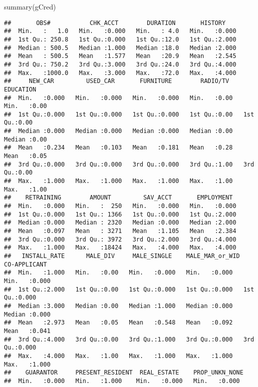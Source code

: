 \documentclass[
]{article}
\newenvironment{Shaded}{\begin{snugshade}}{\end{snugshade}}
\newcommand{\FunctionTok}[1]{\textcolor[rgb]{0.00,0.00,0.00}{#1}}
\newcommand{\NormalTok}[1]{#1}
\begin{document}
\begin{Shaded}
\begin{Highlighting}[]
\FunctionTok{summary}\NormalTok{(gCred)}
\end{Highlighting}
\end{Shaded}

\begin{verbatim}
##       OBS#           CHK_ACCT        DURATION       HISTORY     
##  Min.   :   1.0   Min.   :0.000   Min.   : 4.0   Min.   :0.000  
##  1st Qu.: 250.8   1st Qu.:0.000   1st Qu.:12.0   1st Qu.:2.000  
##  Median : 500.5   Median :1.000   Median :18.0   Median :2.000  
##  Mean   : 500.5   Mean   :1.577   Mean   :20.9   Mean   :2.545  
##  3rd Qu.: 750.2   3rd Qu.:3.000   3rd Qu.:24.0   3rd Qu.:4.000  
##  Max.   :1000.0   Max.   :3.000   Max.   :72.0   Max.   :4.000  
##     NEW_CAR         USED_CAR       FURNITURE        RADIO/TV      EDUCATION   
##  Min.   :0.000   Min.   :0.000   Min.   :0.000   Min.   :0.00   Min.   :0.00  
##  1st Qu.:0.000   1st Qu.:0.000   1st Qu.:0.000   1st Qu.:0.00   1st Qu.:0.00  
##  Median :0.000   Median :0.000   Median :0.000   Median :0.00   Median :0.00  
##  Mean   :0.234   Mean   :0.103   Mean   :0.181   Mean   :0.28   Mean   :0.05  
##  3rd Qu.:0.000   3rd Qu.:0.000   3rd Qu.:0.000   3rd Qu.:1.00   3rd Qu.:0.00  
##  Max.   :1.000   Max.   :1.000   Max.   :1.000   Max.   :1.00   Max.   :1.00  
##    RETRAINING        AMOUNT         SAV_ACCT       EMPLOYMENT   
##  Min.   :0.000   Min.   :  250   Min.   :0.000   Min.   :0.000  
##  1st Qu.:0.000   1st Qu.: 1366   1st Qu.:0.000   1st Qu.:2.000  
##  Median :0.000   Median : 2320   Median :0.000   Median :2.000  
##  Mean   :0.097   Mean   : 3271   Mean   :1.105   Mean   :2.384  
##  3rd Qu.:0.000   3rd Qu.: 3972   3rd Qu.:2.000   3rd Qu.:4.000  
##  Max.   :1.000   Max.   :18424   Max.   :4.000   Max.   :4.000  
##   INSTALL_RATE      MALE_DIV     MALE_SINGLE    MALE_MAR_or_WID  CO-APPLICANT  
##  Min.   :1.000   Min.   :0.00   Min.   :0.000   Min.   :0.000   Min.   :0.000  
##  1st Qu.:2.000   1st Qu.:0.00   1st Qu.:0.000   1st Qu.:0.000   1st Qu.:0.000  
##  Median :3.000   Median :0.00   Median :1.000   Median :0.000   Median :0.000  
##  Mean   :2.973   Mean   :0.05   Mean   :0.548   Mean   :0.092   Mean   :0.041  
##  3rd Qu.:4.000   3rd Qu.:0.00   3rd Qu.:1.000   3rd Qu.:0.000   3rd Qu.:0.000  
##  Max.   :4.000   Max.   :1.00   Max.   :1.000   Max.   :1.000   Max.   :1.000  
##    GUARANTOR     PRESENT_RESIDENT  REAL_ESTATE    PROP_UNKN_NONE 
##  Min.   :0.000   Min.   :1.000    Min.   :0.000   Min.   :0.000  

\end{verbatim}
\end{document}
